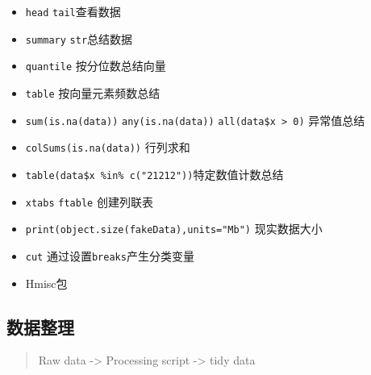 \documentclass[
]{book}
\newenvironment{Shaded}{\begin{snugshade}}{\end{snugshade}}
\newcommand{\CommentTok}[1]{\textcolor[rgb]{0.56,0.35,0.01}{\textit{#1}}}
\newcommand{\DataTypeTok}[1]{\textcolor[rgb]{0.13,0.29,0.53}{#1}}
\newcommand{\DecValTok}[1]{\textcolor[rgb]{0.00,0.00,0.81}{#1}}
\newcommand{\KeywordTok}[1]{\textcolor[rgb]{0.13,0.29,0.53}{\textbf{#1}}}
\newcommand{\NormalTok}[1]{#1}
\newcommand{\OperatorTok}[1]{\textcolor[rgb]{0.81,0.36,0.00}{\textbf{#1}}}
\newcommand{\StringTok}[1]{\textcolor[rgb]{0.31,0.60,0.02}{#1}}
\providecommand{\tightlist}{%
  \setlength{\itemsep}{0pt}\setlength{\parskip}{0pt}}
\begin{document}
\begin{itemize}
\tightlist
\item
  \texttt{head} \texttt{tail}查看数据
\item
  \texttt{summary} \texttt{str}总结数据
\item
  \texttt{quantile} 按分位数总结向量
\item
  \texttt{table} 按向量元素频数总结
\item
  \texttt{sum(is.na(data))} \texttt{any(is.na(data))} \texttt{all(data\$x\ \textgreater{}\ 0)} 异常值总结
\item
  \texttt{colSums(is.na(data))} 行列求和
\item
  \texttt{table(data\$x\ \%in\%\ c("21212"))}特定数值计数总结
\item
  \texttt{xtabs} \texttt{ftable} 创建列联表
\item
  \texttt{print(object.size(fakeData),units="Mb")} 现实数据大小
\item
  \texttt{cut} 通过设置\texttt{breaks}产生分类变量
\item
  Hmisc包
\end{itemize}

\begin{Shaded}
\end{Shaded}

\hypertarget{ux6570ux636eux6574ux7406}{%
\subsection{数据整理}\label{ux6570ux636eux6574ux7406}}

\begin{quote}
Raw data -\textgreater{} Processing script -\textgreater{} tidy data
\end{quote}
\end{document}
